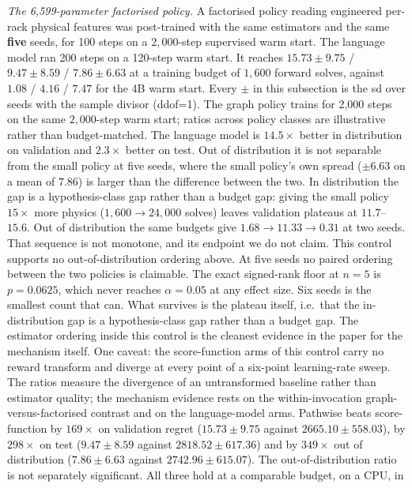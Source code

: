 \emph{The 6{,}599-parameter factorised policy.}  A factorised policy reading
engineered per-rack physical features was post-trained with the same estimators and
the same \textbf{five} seeds, for 100 steps on a $2{,}000$-step supervised warm
start. The language model ran 200 steps on a 120-step warm start.  It reaches $15.73\pm9.75$ / $9.47\pm8.59$ / $7.86\pm6.63$ at a
training budget of $1{,}600$ forward solves, against $1.08$ / $4.16$ / $7.47$ for the
4B warm start.  Every $\pm$ in this subsection is the sd over seeds with the sample
divisor (ddof=1).  The graph policy trains for 2{,}000 steps on the same
$2{,}000$-step warm start; ratios across policy classes are illustrative rather than
budget-matched.  The language model is
$14.5\times$ better in distribution on validation and $2.3\times$ better on test.
Out of distribution it is not separable from the small policy at five seeds, where
the small policy's own spread ($\pm6.63$ on a mean of $7.86$) is larger than the
difference between the two.
In distribution the gap is a hypothesis-class gap rather than a budget gap: giving
the small policy $15\times$ more physics ($1{,}600\to24{,}000$ solves) leaves
validation plateaus at $11.7$--$15.6$.  Out of distribution the same budgets give
$1.68\to11.33\to0.31$ at two seeds.  That sequence is not monotone, and its endpoint
we do not claim.  This control supports no out-of-distribution ordering above.  At five seeds no paired ordering between the two policies
is claimable.  The exact signed-rank floor at $n=5$ is $p=0.0625$, which never reaches
$\alpha=0.05$ at any effect size.  Six seeds is the smallest count that can.  What
survives is the plateau itself, i.e.\ that the
in-distribution gap is a hypothesis-class gap rather than a budget gap. The estimator ordering inside this control is the cleanest evidence in the paper
for the mechanism itself. One caveat: the score-function arms of this control
carry no reward transform and diverge at every point of a six-point learning-rate
sweep. The ratios measure the divergence of an untransformed baseline rather than
estimator quality; the mechanism evidence rests on the within-invocation
graph-versus-factorised contrast and on the language-model arms.  Pathwise beats
score-function by $169\times$ on validation
regret ($15.73\pm9.75$ against $2665.10\pm558.03$), by $298\times$ on test
($9.47\pm8.59$ against $2818.52\pm617.36$) and by $349\times$ out of distribution
($7.86\pm6.63$ against $2742.96\pm615.07$).  The out-of-distribution ratio is not
separately significant.  All three hold at a comparable budget, on a CPU, in
